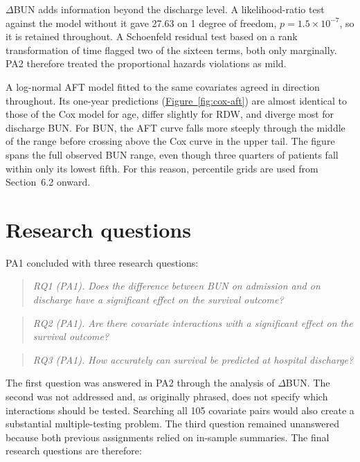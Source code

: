 \documentclass[11pt,a4paper]{article}
\newcommand{\figref}[1]{\hyperref[#1]{Figure~\ref*{#1}}}
\newcommand{\dbun}{$\Delta$BUN}
\begin{document}
\dbun{} adds information beyond the discharge level. A likelihood-ratio test against the model without it gave 27.63 on 1 degree of freedom, $p = 1.5 \times 10^{-7}$, so it is retained throughout. A Schoenfeld residual test based on a rank transformation of time flagged two of the sixteen terms, both only marginally. PA2 therefore treated the proportional hazards violations as mild.

A log-normal AFT model fitted to the same covariates agreed in direction throughout. Its one-year predictions (\figref{fig:cox-aft}) are almost identical to those of the Cox model for age, differ slightly for RDW, and diverge most for discharge BUN. For BUN, the AFT curve falls more steeply through the middle of the range before crossing above the Cox curve in the upper tail. The figure spans the full observed BUN range, even though three quarters of patients fall within only its lowest fifth. For this reason, percentile grids are used from Section~6.2 onward.

\section{Research questions}

PA1 concluded with three research questions:

\begin{quote}\itshape
RQ1 (PA1). Does the difference between BUN on admission and on discharge have a significant
effect on the survival outcome?
\end{quote}

\begin{quote}\itshape
RQ2 (PA1). Are there covariate interactions with a significant effect on the survival
outcome?
\end{quote}

\begin{quote}\itshape
RQ3 (PA1). How accurately can survival be predicted at hospital discharge?
\end{quote}

The first question was answered in PA2 through the analysis of \dbun{}. The second was not addressed and, as originally phrased, does not specify which interactions should be tested. Searching all 105 covariate pairs would also create a substantial multiple-testing problem. The third question remained unanswered because both previous assignments relied on in-sample summaries. The final research questions are therefore:
\end{document}
